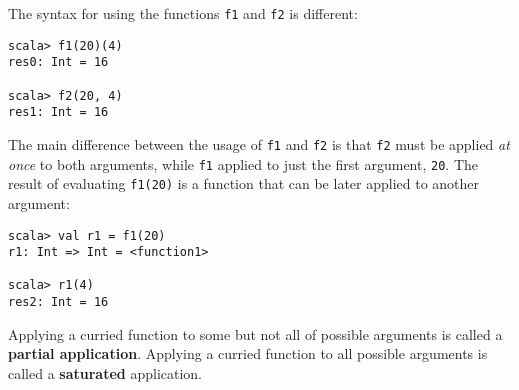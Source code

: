 The syntax for using the functions \lstinline!f1!
and \lstinline!f2! is different:
\begin{lstlisting}
scala> f1(20)(4)
res0: Int = 16

scala> f2(20, 4)
res1: Int = 16
\end{lstlisting}
The main difference between the usage of \lstinline!f1!
and \lstinline!f2! is that
\lstinline!f2! must be
applied \emph{at once} to both arguments, while \lstinline!f1!
applied to just the first argument, \lstinline!20!.
The result of evaluating \lstinline!f1(20)!
is a function that can be later applied to another argument:
\begin{lstlisting}
scala> val r1 = f1(20)
r1: Int => Int = <function1> 

scala> r1(4)
res2: Int = 16
\end{lstlisting}
Applying a curried function to some but not all of possible arguments
is called a \textbf{partial application}.
Applying a curried function to all possible arguments is called a
\textbf{saturated} application.


